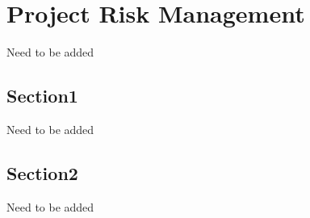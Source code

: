 \chapter{Project Risk Management}
Need to be added
\section{Section1}
Need to be added
\section{Section2}
Need to be added